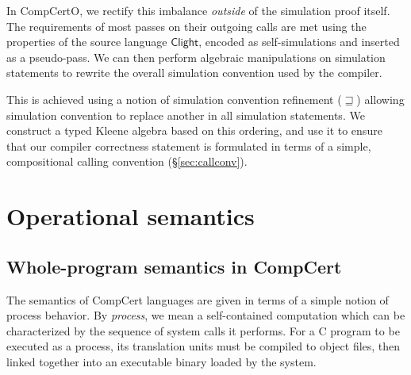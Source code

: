 \documentclass[sigplan,10pt,review]{acmart}
\newcommand{\kw}[1]{\ensuremath{ \mathsf{#1} }}
\newcommand{\scref}{\sqsupseteq}
\begin{document}

In CompCertO,
we rectify this imbalance \emph{outside}
of the simulation proof itself.
The requirements of most passes
on their outgoing calls
are met using the properties
of the source language $\kw{Clight}$,
encoded as self-simulations
and inserted as a pseudo-pass.
We can then perform algebraic manipulations
on simulation statements
to rewrite the overall simulation convention
used by the compiler.

This is achieved using a notion of
simulation convention refinement ($\scref$)
allowing simulation convention
to replace another in all simulation statements.
We construct a typed Kleene algebra \cite{tka}
based on this ordering,
and use it to ensure that
our compiler correctness statement
is formulated in terms of a simple,
compositional calling convention (\S\ref{sec:callconv}).



\section{Operational semantics} \label{sec:sem} %


\subsection{Whole-program semantics in CompCert} \label{sec:sem:closed} %

The semantics of CompCert languages
are given in terms of a simple notion of process behavior.
By \emph{process}, we mean a self-contained computation
which can be characterized by
the sequence of system calls it performs.
For a C program to be executed as a process,
its translation units must be compiled to object files,
then linked together
into an executable binary
loaded by the system.
\end{document}
